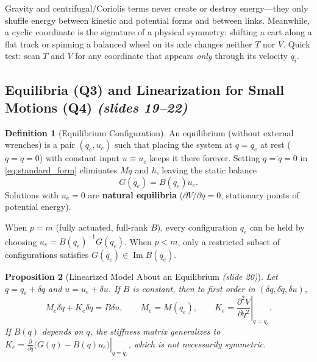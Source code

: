 \documentclass[11pt, a4paper]{article}
\theoremstyle{definition}
\newtheorem{definition}{Definition}[section]
\theoremstyle{plain}
\newtheorem{proposition}[definition]{Proposition}
\begin{document}
\begin{intuition}
Gravity and centrifugal/Coriolis terms never create or destroy energy---they only shuffle energy between kinetic and potential forms and between links. Meanwhile, a cyclic coordinate is the signature of a physical symmetry: shifting a cart along a flat track or spinning a balanced wheel on its axle changes neither $T$ nor $V$. Quick test: scan $T$ and $V$ for any coordinate that appears \emph{only} through its velocity $\dot{q}_i$.
\end{intuition}

\subsection{Equilibria (Q3) and Linearization for Small Motions (Q4) \emph{(slides 19--22)}}

\begin{definition}[Equilibrium Configuration]
An equilibrium (without external wrenches) is a pair $(q_e, u_e)$ such that placing the system at $q = q_e$ at rest ($\dot{q} = \ddot{q} = 0$) with constant input $u \equiv u_e$ keeps it there forever. Setting $\dot{q} = \ddot{q} = 0$ in \eqref{eq:standard_form} eliminates $M\ddot{q}$ and $h$, leaving the static balance
\[
  G(q_e) = B(q_e) u_e.
\]
Solutions with $u_e = 0$ are \textbf{natural equilibria} ($\partial V / \partial q = 0$, stationary points of potential energy).
\end{definition}

When $p = m$ (fully actuated, full-rank $B$), every configuration $q_e$ can be held by choosing $u_e = B(q_e)^{-1} G(q_e)$. When $p < m$, only a restricted subset of configurations satisfies $G(q_e) \in \operatorname{Im} B(q_e)$.

\begin{proposition}[Linearized Model About an Equilibrium \emph{(slide 20)}]
Let $q = q_e + \delta q$ and $u = u_e + \delta u$. If $B$ is constant, then to first order in $(\delta q, \delta \dot{q}, \delta u)$,
\begin{equation}
  M_e \delta\ddot{q} + K_e \delta q = B \delta u,
  \qquad M_e = M(q_e), \qquad K_e = \left.\frac{\partial^2 V}{\partial q^2}\right|_{q=q_e}.
  \label{eq:linearized}
\end{equation}
If $B(q)$ depends on $q$, the stiffness matrix generalizes to $K_e = \left.\frac{\partial}{\partial q}\big(G(q) - B(q)u_e\big)\right|_{q=q_e}$, which is not necessarily symmetric.
\end{proposition}
\end{document}
